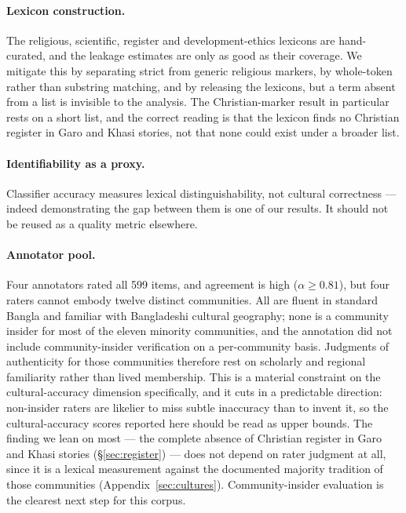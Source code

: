 \documentclass[11pt]{article}
\begin{document}
\paragraph{Lexicon construction.} The religious, scientific, register and
development-ethics lexicons are hand-curated, and the leakage estimates are
only as good as their coverage. We mitigate this by separating strict from
generic religious markers, by whole-token rather than substring matching, and
by releasing the lexicons, but a term absent from a list is invisible to the
analysis. The Christian-marker result in particular rests on a short list, and
the correct reading is that the lexicon finds no Christian register in Garo and
Khasi stories, not that none could exist under a broader list.

\paragraph{Identifiability as a proxy.} Classifier accuracy measures lexical
distinguishability, not cultural correctness --- indeed demonstrating the gap
between them is one of our results. It should not be reused as a quality metric
elsewhere.

\paragraph{Annotator pool.} Four annotators rated all 599 items, and
agreement is high ($\alpha \ge 0.81$), but four raters cannot embody twelve
distinct communities. All are fluent in standard Bangla and familiar with
Bangladeshi cultural geography; none is a community insider for most of the
eleven minority communities, and the annotation did not include
community-insider verification on a per-community basis. Judgments of
authenticity for those communities therefore rest on scholarly and regional
familiarity rather than lived membership. This is a material constraint on the
cultural-accuracy dimension specifically, and it cuts in a predictable
direction: non-insider raters are likelier to miss subtle inaccuracy than to
invent it, so the cultural-accuracy scores reported here should be read as
upper bounds. The finding we lean on most --- the complete absence of Christian
register in Garo and Khasi stories (\S\ref{sec:register}) --- does not depend on
rater judgment at all, since it is a lexical measurement against the
documented majority tradition of those communities
(Appendix~\ref{sec:cultures}). Community-insider evaluation is the clearest
next step for this corpus.
\end{document}
